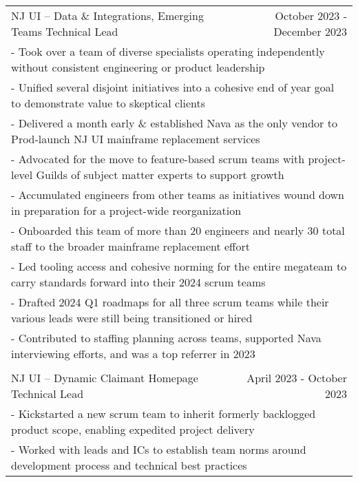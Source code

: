 \documentclass[letterpaper]{article}
\begin{document}
\begin{center}
\begin{tabular}{p{}p{}r}
			  \multicolumn{2}{p{0.5\textwidth}}{\quad NJ UI -- Data \& Integrations, Emerging Teams Technical Lead}
			  &
			  {October 2023 - December 2023 \quad\quad\quad\quad}
		  \\
			  \multicolumn{3}{p{\textwidth}}{\quad\quad - Took over a team of diverse specialists operating independently without consistent engineering or product leadership} \\
			  \multicolumn{3}{p{\textwidth}}{\quad\quad - Unified several disjoint initiatives into a cohesive end of year goal to demonstrate value to skeptical clients} \\
			  \multicolumn{3}{p{\textwidth}}{\quad\quad - Delivered a month early \& established Nava as the only vendor to Prod-launch NJ UI mainframe replacement services} \\
			  \multicolumn{3}{p{\textwidth}}{\quad\quad - Advocated for the move to feature-based scrum teams with project-level Guilds of subject matter experts to support growth} \\
			  \multicolumn{3}{p{\textwidth}}{\quad\quad - Accumulated engineers from other teams as initiatives wound down in preparation for a project-wide reorganization} \\
			  \multicolumn{3}{p{\textwidth}}{\quad\quad - Onboarded this team of more than 20 engineers and nearly 30 total staff to the broader mainframe replacement effort} \\
			  \multicolumn{3}{p{\textwidth}}{\quad\quad - Led tooling access and cohesive norming for the entire megateam to carry standards forward into their 2024 scrum teams} \\
			  \multicolumn{3}{p{\textwidth}}{\quad\quad - Drafted 2024 Q1 roadmaps for all three scrum teams while their various leads were still being transitioned or hired} \\
			  \multicolumn{3}{p{\textwidth}}{\quad\quad - Contributed to staffing planning across teams, supported Nava interviewing efforts, and was a top referrer in 2023} 
		  \\
		  \\		%
			  \multicolumn{2}{p{0.5\textwidth}}{\quad NJ UI -- Dynamic Claimant Homepage Technical Lead}
			  &
			  {April 2023 - October 2023 \quad\quad\quad\quad}
		  \\
			  \multicolumn{3}{p{\textwidth}}{\quad\quad - Kickstarted a new scrum team to inherit formerly backlogged product scope, enabling expedited project delivery} \\
			  \multicolumn{3}{p{\textwidth}}{\quad\quad - Worked with leads and ICs to establish team norms around development process and technical best practices} \\

\end{tabular}
\end{center}
\end{document}
